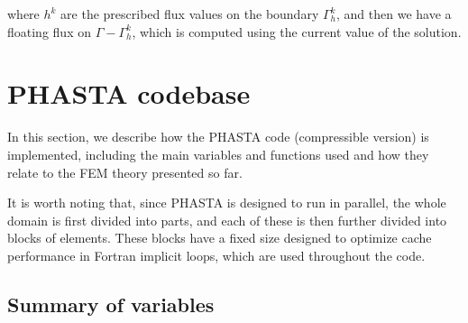 \documentclass{ucb}
\begin{document}
where $h^k$ are the prescribed flux values on the boundary $\Gamma_h^k$, and then we have a floating flux on $\Gamma - \Gamma_h^k$, which is computed using the current value of the solution.




\section{PHASTA codebase}
\label{sec:code}

In this section, we describe how the PHASTA code (compressible version) is implemented, including the main variables and functions used and how they relate to the FEM theory presented so far.

It is worth noting that, since PHASTA is designed to run in parallel, the whole domain is first divided into parts, and each of these is then further divided into blocks of elements. These blocks have a fixed size designed to optimize cache performance in Fortran implicit loops, which are used throughout the code.

\subsection{Summary of variables}
\end{document}
